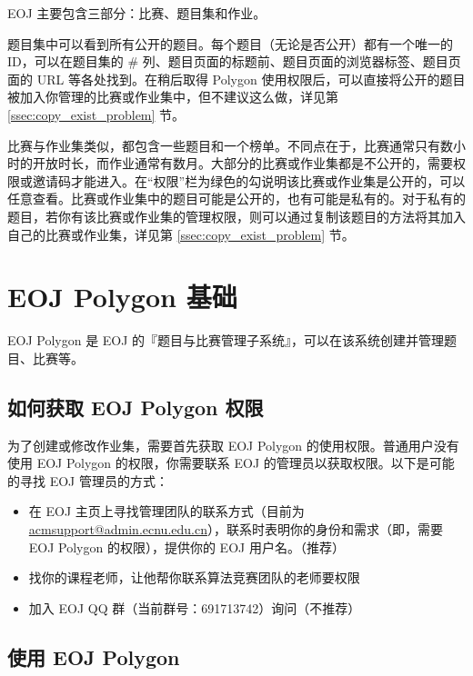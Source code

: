 \documentclass[oneside]{book}
\begin{document}
EOJ 主要包含三部分：比赛、题目集和作业。

题目集中可以看到所有公开的题目。每个题目（无论是否公开）都有一个唯一的 ID，可以在题目集的 \# 列、题目页面的标题前、题目页面的浏览器标签、题目页面的 URL 等各处找到。在稍后取得 Polygon 使用权限后，可以直接将公开的题目被加入你管理的比赛或作业集中，但不建议这么做，详见第 \ref{ssec:copy_exist_problem} 节。

比赛与作业集类似，都包含一些题目和一个榜单。不同点在于，比赛通常只有数小时的开放时长，而作业通常有数月。大部分的比赛或作业集都是不公开的，需要权限或邀请码才能进入。在``权限''栏为绿色的勾说明该比赛或作业集是公开的，可以任意查看。比赛或作业集中的题目可能是公开的，也有可能是私有的。对于私有的题目，若你有该比赛或作业集的管理权限，则可以通过复制该题目的方法将其加入自己的比赛或作业集，详见第 \ref{ssec:copy_exist_problem} 节。

\section{EOJ Polygon 基础}

EOJ Polygon 是 EOJ 的『题目与比赛管理子系统』，可以在该系统创建并管理题目、比赛等。

\subsection{如何获取 EOJ Polygon 权限}

\label{ssec:eoj_polygon_permission}

为了创建或修改作业集，需要首先获取 EOJ Polygon 的使用权限。普通用户没有使用 EOJ Polygon 的权限，你需要联系 EOJ 的管理员以获取权限。以下是可能的寻找 EOJ 管理员的方式：

\begin{itemize}
    \item 在 EOJ 主页上寻找管理团队的联系方式（目前为 \href{mailto:acmsupport@admin.ecnu.edu.cn}{acmsupport@admin.ecnu.edu.cn}），联系时表明你的身份和需求（即，需要 EOJ Polygon 的权限），提供你的 EOJ 用户名。（推荐）
    \item 找你的课程老师，让他帮你联系算法竞赛团队的老师要权限
    \item 加入 EOJ QQ 群（当前群号：691713742）询问（不推荐）
\end{itemize}

\subsection{使用 EOJ Polygon}
\end{document}
